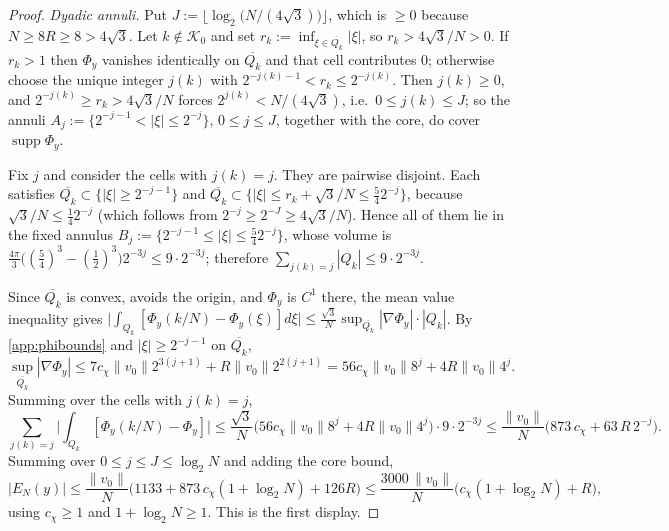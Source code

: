 \begin{proof}
\emph{Dyadic annuli.} Put $J:=\lfloor\log_2\big(N/(4\sqrt3)\big)\rfloor$,
which is $\ge0$ because $N\ge8R\ge8>4\sqrt3$. Let $k\notin\mathcal K_0$
and set $r_k:=\inf_{\xi\in \overline{Q_k}}|\xi|$, so $r_k>4\sqrt3/N>0$.
If $r_k>1$ then $\Phi_y$ vanishes identically on $\overline{Q_k}$ and
that cell contributes $0$; otherwise choose the unique integer $j(k)$
with $2^{-j(k)-1}<r_k\le2^{-j(k)}$. Then $j(k)\ge0$, and
$2^{-j(k)}\ge r_k>4\sqrt3/N$ forces $2^{j(k)}<N/(4\sqrt3)$, i.e.\
$0\le j(k)\le J$; so the annuli
$A_j:=\{2^{-j-1}<|\xi|\le2^{-j}\}$, $0\le j\le J$, together with the
core, do cover $\operatorname{supp}\Phi_y$.

Fix $j$ and consider the cells with $j(k)=j$. They are pairwise
disjoint. Each satisfies $\overline{Q_k}\subset\{|\xi|\ge2^{-j-1}\}$ and
$\overline{Q_k}\subset\{|\xi|\le r_k+\sqrt3/N\le\tfrac54 2^{-j}\}$,
because $\sqrt3/N\le\tfrac14 2^{-j}$ (which follows from
$2^{-j}\ge2^{-J}\ge4\sqrt3/N$). Hence all of them lie in the fixed
annulus $B_j:=\{2^{-j-1}\le|\xi|\le\tfrac54 2^{-j}\}$, whose volume is
$\frac{4\pi}3\big((\tfrac54)^3-(\tfrac12)^3\big)2^{-3j}\le9\cdot2^{-3j}$;
therefore $\sum_{j(k)=j}|Q_k|\le9\cdot2^{-3j}$.

Since $\overline{Q_k}$ is convex, avoids the origin, and $\Phi_y$ is
$C^1$ there, the mean value inequality gives
$\big|\int_{Q_k}[\Phi_y(k/N)-\Phi_y(\xi)]d\xi\big|
\le\frac{\sqrt3}{N}\sup_{\overline{Q_k}}|\nabla\Phi_y|\cdot|Q_k|$. By
\eqref{app:phibounds} and $|\xi|\ge2^{-j-1}$ on $\overline{Q_k}$,
\[
\sup_{\overline{Q_k}}|\nabla\Phi_y|
\le 7c_\chi\|v_0\|2^{3(j+1)}+R\|v_0\|2^{2(j+1)}
=56c_\chi\|v_0\|8^{j}+4R\|v_0\|4^{j}.
\]
Summing over the cells with $j(k)=j$,
\[
\sum_{j(k)=j}\Big|\int_{Q_k}[\Phi_y(k/N)-\Phi_y]\Big|
\le\frac{\sqrt3}{N}\big(56c_\chi\|v_0\|8^{j}+4R\|v_0\|4^{j}\big)
\cdot9\cdot2^{-3j}
\le\frac{\|v_0\|}{N}\big(873\,c_\chi+63\,R\,2^{-j}\big).
\]
Summing over $0\le j\le J\le\log_2N$ and adding the core bound,
\[
|E_N(y)|\le\frac{\|v_0\|}{N}
\Big(1133+873\,c_\chi(1+\log_2N)+126R\Big)
\le\frac{3000\,\|v_0\|}{N}\big(c_\chi(1+\log_2N)+R\big),
\]
using $c_\chi\ge1$ and $1+\log_2N\ge1$. This is the first display.


\end{proof}
